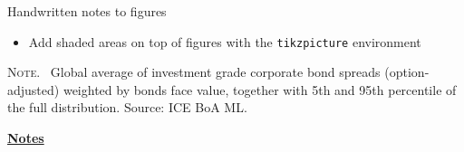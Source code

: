 \documentclass[10pt]{beamer}
\begin{document}
\begin{frame}[t]
	{Handwritten notes to figures}
	\begin{itemize}
		\item Add shaded areas on top of figures with the \texttt{tikzpicture} environment
	\end{itemize}
	\begin{center}
		\begin{minipage}[b]{.6\textwidth}
			\tiny{{\scshape Note}. \ Global average of investment grade corporate bond spreads (option-adjusted) weighted by bonds face value, together with 5th and 95th percentile of the full distribution. Source: ICE BoA ML.} 
		\end{minipage}
	\end{center}
\end{frame}	
\begin{flushleft}
	\underline{\textbf{Notes}}\setlength{\parskip}{.15cm}\notesize\newline\par
\end{flushleft}

\end{document}
